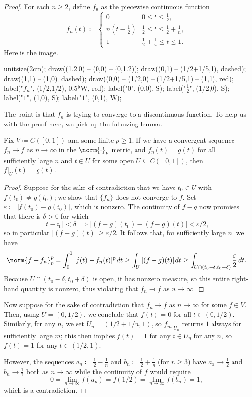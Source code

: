\documentclass[../notes.tex]{subfiles}
\begin{document}
\begin{proof}
	For each $n\ge2$, define $f_n$ as the piecewise continuous function
	\[f_n(t)\coloneqq\begin{cases}
		0 & 0\le t\le \frac12, \\
		n(t-\frac12) & \frac12\le t\le\frac12+\frac1n, \\
		1 & \frac12+\frac1n\le t\le1.
	\end{cases}\]
	Here is the image.
	\begin{center}
		\begin{asy}
			unitsize(2cm);
			draw((1.2,0) -- (0,0) -- (0,1.2));
			draw((0,1) -- (1/2+1/5,1), dashed);
			draw((1,1) -- (1,0), dashed);
			draw((0,0) -- (1/2,0) -- (1/2+1/5,1) -- (1,1), red);
			label("$f_n$", (1/2,1/2), 0.5*W, red);
			label("$0$", (0,0), S);
			label("$\frac12$", (1/2,0), S);
			label("$1$", (1,0), S);
			label("$1$", (0,1), W);
		\end{asy}
	\end{center}
	The point is that $f_n$ is trying to converge to a discontinuous function. To help us with the proof here, we pick up the following lemma.
	\begin{lemma}
		Fix $V\coloneqq C([0,1])$ and some finite $p\ge1$. If we have a convergent sequence $f_n\to f$ as $n\to\infty$ in the $\norm{\cdot}_p$ metric, and $f_n(t)=g(t)$ for all sufficiently large $n$ and $t\in U$ for some open $U\subseteq C([0,1])$, then $f|_U(t)=g(t)$.
	\end{lemma}
	\begin{proof}
		Suppose for the sake of contradiction that we have $t_0\in U$ with $f(t_0)\ne g(t_0)$; we show that $\{f_n\}$ does not converge to $f$. Set $\varepsilon\coloneqq|f(t_0)-g(t_0)|$, which is nonzero. The continuity of $f-g$ now promises that there is $\delta>0$ for which
		\[|t-t_0|<\delta\implies|(f-g)(t_0)-(f-g)(t)|<\varepsilon/2,\]
		so in particular $|(f-g)(t)|\ge\varepsilon/2$. It follows that, for sufficiently large $n$, we have
		\[\norm{f-f_n}_p^p=\int_0^1|f(t)-f_n(t)|^p\,dt\ge\int_U|(f-g)(t)|\,dt\ge\int_{U\cap(t_0-\delta,t_0+\delta)}\frac\varepsilon2\,dt.\]
		Because $U\cap(t_0-\delta,t_0+\delta)$ is open, it has nonzero measure, so this entire right-hand quantity is nonzero, thus violating that $f_n\to f$ as $n\to\infty$.
	\end{proof}
	Now suppose for the sake of contradiction that $f_n\to f$ as $n\to\infty$ for some $f\in V$. Then, using $U=(0,1/2)$, we conclude that $f(t)=0$ for all $t\in(0,1/2)$. Similarly, for any $n$, we set $U_n=(1/2+1/n,1)$, so $f_m|_{U_n}$ returns $1$ always for sufficiently large $m$; this then implies $f(t)=1$ for any $t\in U_n$ for any $n$, so $f(t)=1$ for any $t\in(1/2,1)$.

	However, the sequences $a_n\coloneqq\frac12-\frac1n$ and $b_n\coloneqq\frac12+\frac1n$ (for $n\ge3$) have $a_n\to\frac12$ and $b_n\to\frac12$ both as $n\to\infty$ while the continuity of $f$ would require
	\[0=\lim_{n\to\infty}f(a_n)=f(1/2)=\lim_{n\to\infty}f(b_n)=1,\]
	which is a contradiction.
\end{proof}
\end{document}
